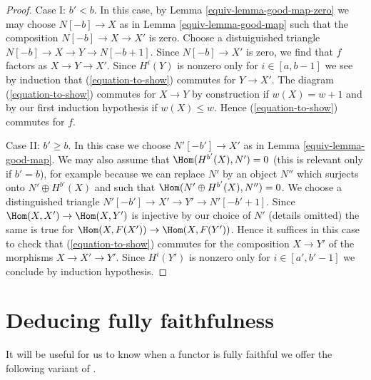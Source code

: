 \begin{proof}
\medskip\noindent
Case I: $b' < b$. In this case, by Lemma \ref{equiv-lemma-good-map-zero}
we may choose $N[-b] \to X$ as in Lemma \ref{equiv-lemma-good-map}
such that the composition $N[-b] \to X \to X'$ is zero.
Choose a distuiguished triangle $N[-b] \to X \to Y \to N[-b + 1]$. Since
$N[-b] \to X'$ is zero, we find that $f$ factors
as $X \to Y \to X'$. Since $H^i(Y)$ is nonzero only for $i \in [a, b - 1]$
we see by induction that (\ref{equation-to-show}) commutes for
$Y \to X'$. The diagram (\ref{equation-to-show}) commutes for
$X \to Y$ by construction if $w(X) = w + 1$ and by our first
induction hypothesis if $w(X) \leq w$.
Hence (\ref{equation-to-show}) commutes for $f$.

\medskip\noindent
Case II: $b' \geq b$. In this case we choose $N'[-b'] \to X'$
as in Lemma \ref{equiv-lemma-good-map}.
We may also assume that $\Hom(H^{b'}(X), N') = 0$ (this is
relevant only if $b' = b$), for example because we can
replace $N'$ by an object $N''$ which surjects onto $N' \oplus H^{b'}(X)$
and such that $\Hom(N' \oplus H^{b'}(X), N'') = 0$.
We choose a distinguished triangle
$N'[-b'] \to X' \to Y' \to N'[-b' + 1]$. Since
$\Hom(X, X') \to \Hom(X, Y')$ is injective by our choice of $N'$
(details omitted) the same is true for
$\Hom(X, F(X')) \to \Hom(X, F(Y'))$.
Hence it suffices in this case to check that
(\ref{equation-to-show}) commutes for the composition $X \to Y'$
of the morphisms $X \to X' \to Y'$.
Since $H^i(Y')$ is nonzero only for $i \in [a', b' - 1]$
we conclude by induction hypothesis.
\end{proof}

\section{Deducing fully faithfulness}
\label{equiv-section-get-fully-faithful}
It will be useful for us to know when a functor is fully faithful
we offer the following variant of \cite[Lemma 2.15]{Orlov-K3}.

